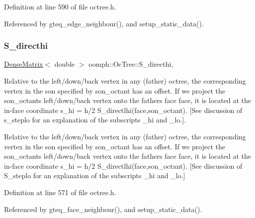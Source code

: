 Definition at line 590 of file octree.\+h.



Referenced by gteq\+\_\+edge\+\_\+neighbour(), and setup\+\_\+static\+\_\+data().

\mbox{\label{classoomph_1_1OcTree_a11aca558846c26e31f802396508bea51}} 
\subsubsection{\texorpdfstring{S\+\_\+directhi}{S\_directhi}}
{\footnotesize\ttfamily \hyperlink{classoomph_1_1DenseMatrix}{Dense\+Matrix}$<$ double $>$ oomph\+::\+Oc\+Tree\+::\+S\+\_\+directhi\hspace{0.3cm}{\ttfamily [static]}, {\ttfamily [private]}}



Relative to the left/down/back vertex in any (father) octree, the corresponding vertex in the son specified by {\ttfamily son\+\_\+octant} has an offset. If we project the son\+\_\+octant\textquotesingle{}s left/down/back vertex onto the father\textquotesingle{}s face {\ttfamily face}, it is located at the in-\/face coordinate {\ttfamily s\+\_\+hi} = h/2 {\ttfamily S\+\_\+directlhi(face,son\+\_\+octant)}. \mbox{[}See discussion of {\ttfamily s\+\_\+steplo} for an explanation of the subscripts {\ttfamily \+\_\+hi} and {\ttfamily \+\_\+lo}.\mbox{]}. 

Relative to the left/down/back vertex in any (father) octree, the corresponding vertex in the son specified by {\ttfamily son\+\_\+octant} has an offset. If we project the son\+\_\+octant\textquotesingle{}s left/down/back vertex onto the father\textquotesingle{}s face {\ttfamily face}, it is located at the in-\/face coordinate {\ttfamily s\+\_\+hi} = h/2 {\ttfamily S\+\_\+directlhi(face,son\+\_\+octant)}. \mbox{[}See discussion of {\ttfamily S\+\_\+steplo} for an explanation of the subscripts {\ttfamily \+\_\+hi} and {\ttfamily \+\_\+lo}.\mbox{]} 

Definition at line 571 of file octree.\+h.



Referenced by gteq\+\_\+face\+\_\+neighbour(), and setup\+\_\+static\+\_\+data().

\mbox{\label{classoomph_1_1OcTree_a2ece71f32cf50ba50851d2102af15426}} 
